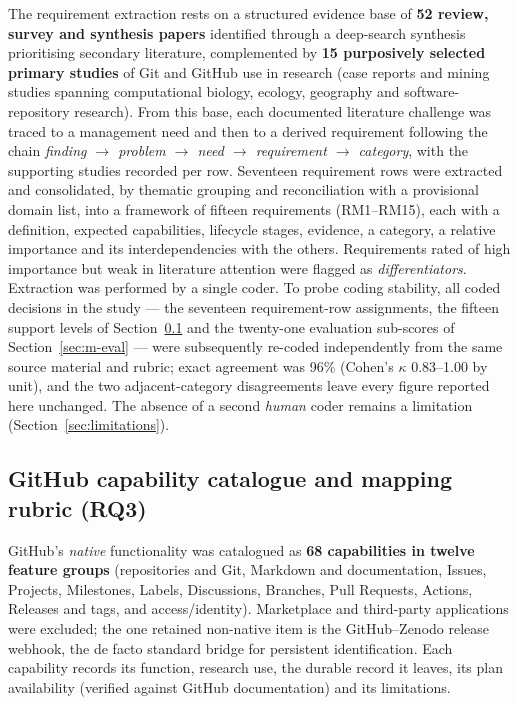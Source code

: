 \documentclass[pdflatex,sn-mathphys-num]{sn-jnl}%
\begin{document}
The requirement extraction rests on a structured evidence base of \textbf{52 review, survey and synthesis papers} identified through a deep-search synthesis prioritising secondary literature, complemented by \textbf{15 purposively selected primary studies} of Git and GitHub use in research (case reports and mining studies spanning computational biology, ecology, geography and software-repository research). From this base, each documented literature challenge was traced to a management need and then to a derived requirement following the chain \emph{finding $\rightarrow$ problem $\rightarrow$ need $\rightarrow$ requirement $\rightarrow$ category}, with the supporting studies recorded per row. Seventeen requirement rows were extracted and consolidated, by thematic grouping and reconciliation with a provisional domain list, into a framework of fifteen requirements (RM1--RM15), each with a definition, expected capabilities, lifecycle stages, evidence, a category, a relative importance and its interdependencies with the others. Requirements rated of high importance but weak in literature attention were flagged as \emph{differentiators}. Extraction was performed by a single coder. To probe coding stability, all coded decisions in the study --- the seventeen requirement-row assignments, the fifteen support levels of Section~\ref{sec:m-catalogue} and the twenty-one evaluation sub-scores of Section~\ref{sec:m-eval} --- were subsequently re-coded independently from the same source material and rubric; exact agreement was 96\% (Cohen's $\kappa$ 0.83--1.00 by unit), and the two adjacent-category disagreements leave every figure reported here unchanged. The absence of a second \emph{human} coder remains a limitation (Section~\ref{sec:limitations}).

\subsection{GitHub capability catalogue and mapping rubric (RQ3)}\label{sec:m-catalogue}

GitHub's \emph{native} functionality was catalogued as \textbf{68 capabilities in twelve feature groups} (repositories and Git, Markdown and documentation, Issues, Projects, Milestones, Labels, Discussions, Branches, Pull Requests, Actions, Releases and tags, and access/identity). Marketplace and third-party applications were excluded; the one retained non-native item is the GitHub--Zenodo release webhook, the de facto standard bridge for persistent identification. Each capability records its function, research use, the durable record it leaves, its plan availability (verified against GitHub documentation) and its limitations.
\end{document}
